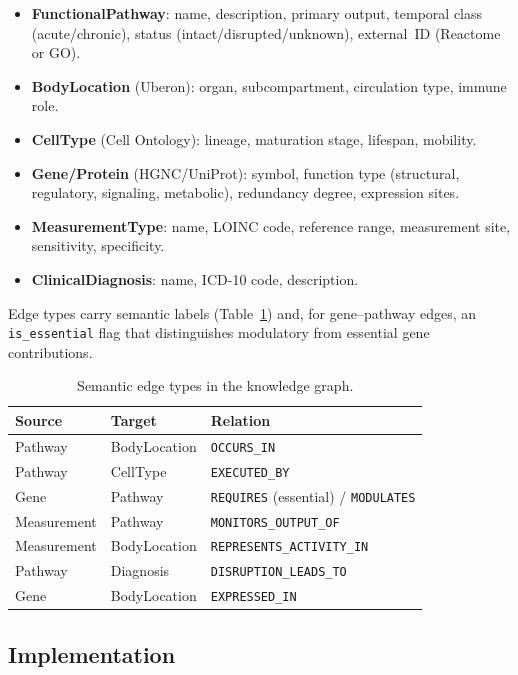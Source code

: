 \documentclass[12pt,a4paper]{article}
\begin{document}
\begin{itemize}
    \item \textbf{FunctionalPathway}: name, description, primary output, temporal class (acute/chronic), status (intact/disrupted/unknown), external~ID (Reactome or GO).
    \item \textbf{BodyLocation} (Uberon): organ, subcompartment, circulation type, immune role.
    \item \textbf{CellType} (Cell Ontology): lineage, maturation stage, lifespan, mobility.
    \item \textbf{Gene/Protein} (HGNC/UniProt): symbol, function type (structural, regulatory, signaling, metabolic), redundancy degree, expression sites.
    \item \textbf{MeasurementType}: name, LOINC code, reference range, measurement site, sensitivity, specificity.
    \item \textbf{ClinicalDiagnosis}: name, ICD-10 code, description.
\end{itemize}

Edge types carry semantic labels (Table~\ref{tab:edges}) and, for gene--pathway edges, an \texttt{is\_essential} flag that distinguishes modulatory from essential gene contributions.

\begin{table}[H]
\centering
\caption{Semantic edge types in the knowledge graph.}
\label{tab:edges}
\begin{tabular}{lll}
\toprule
\textbf{Source} & \textbf{Target} & \textbf{Relation} \\
\midrule
Pathway & BodyLocation & \texttt{OCCURS\_IN} \\
Pathway & CellType & \texttt{EXECUTED\_BY} \\
Gene & Pathway & \texttt{REQUIRES} (essential) / \texttt{MODULATES} \\
Measurement & Pathway & \texttt{MONITORS\_OUTPUT\_OF} \\
Measurement & BodyLocation & \texttt{REPRESENTS\_ACTIVITY\_IN} \\
Pathway & Diagnosis & \texttt{DISRUPTION\_LEADS\_TO} \\
Gene & BodyLocation & \texttt{EXPRESSED\_IN} \\
\bottomrule
\end{tabular}
\end{table}

\subsection{Implementation}
\label{sec:implementation}
\end{document}
